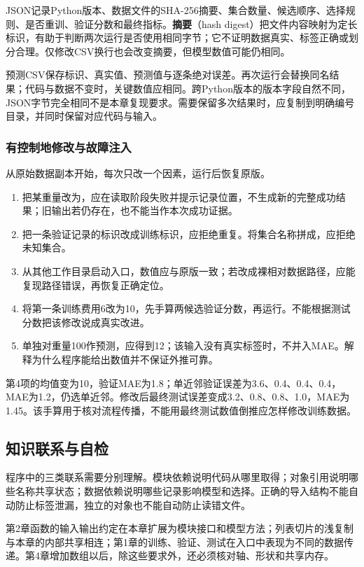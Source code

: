 \documentclass[UTF8,fontset=none,zihao=-4,a4paper]{ctexart}
\newcommand{\term}[1]{\textbf{#1}}
\newcommand{\code}[1]{\texttt{\detokenize{#1}}}
\numberwithin{equation}{section}
\numberwithin{figure}{section}
\begin{document}
JSON记录Python版本、数据文件的SHA-256摘要、集合数量、候选顺序、选择规则、是否重训、验证分数和最终指标。\term{摘要}（hash digest）把文件内容映射为定长标识，有助于判断两次运行是否使用相同字节；它不证明数据真实、标签正确或划分合理。仅修改CSV换行也会改变摘要，但模型数值可能仍相同。

预测CSV保存标识、真实值、预测值与逐条绝对误差。再次运行会替换同名结果；代码与数据不变时，关键数值应相同。跨Python版本的版本字段自然不同，JSON字节完全相同不是本章复现要求。需要保留多次结果时，应复制到明确编号目录，并同时保留对应代码与输入。

\subsubsection{有控制地修改与故障注入}
从原始数据副本开始，每次只改一个因素，运行后恢复原版。
\begin{enumerate}
\item 把某重量改为\code{nan}，应在读取阶段失败并提示记录位置，不生成新的完整成功结果；旧输出若仍存在，也不能当作本次成功证据。
\item 把一条验证记录的标识改成训练标识，应拒绝重复。将集合名称拼成\code{validaton}，应拒绝未知集合。
\item 从其他工作目录启动入口，数值应与原版一致；若改成裸相对数据路径，应能复现路径错误，再恢复正确定位。
\item 将第一条训练费用6改为10，先手算两候选验证分数，再运行。不能根据测试分数把该修改说成真实改进。
\item 单独对重量100作预测，应得到12；该输入没有真实标签时，不并入MAE。解释为什么程序能给出数值并不保证外推可靠。
\end{enumerate}
第4项的均值变为10，验证MAE为1.8；单近邻验证误差为3.6、0.4、0.4、0.4，MAE为1.2，仍选单近邻。修改后最终测试误差变成3.2、0.8、0.8、1.0，MAE为1.45。该手算用于核对流程传播，不能用最终测试数值倒推应怎样修改训练数据。

\subsection{知识联系与自检}
程序中的三类联系需要分别理解。模块依赖说明代码从哪里取得；对象引用说明哪些名称共享状态；数据依赖说明哪些记录影响模型和选择。正确的导入结构不能自动防止标签泄漏，独立的对象也不能自动防止读错文件。

第2章函数的输入输出约定在本章扩展为模块接口和模型方法；列表切片的浅复制与本章的内部共享相连；第1章的训练、验证、测试在入口中表现为不同的数据传递。第4章增加数组以后，除这些要求外，还必须核对轴、形状和共享内存。
\end{document}
